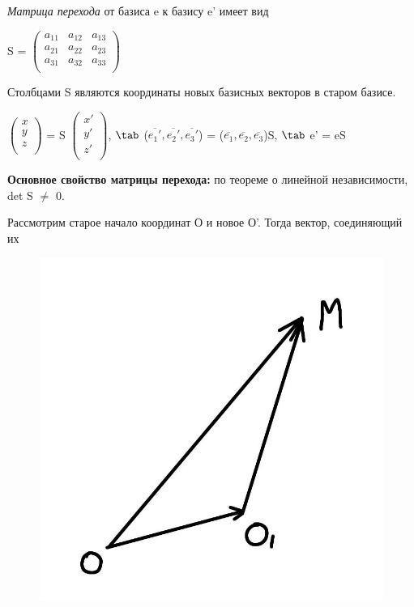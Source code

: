 \begin{definition}
	\textit{Матрица перехода} от базиса e к базису e' имеет вид\\
	\begin{center}
		S =
		$\begin{pmatrix}
			a_{11} & a_{12} & a_{13}\\
			a_{21} & a_{22} & a_{23}\\
			a_{31} & a_{32} & a_{33}\\
		\end{pmatrix}$
	\end{center} 
\end{definition}

Столбцами S являются координаты новых базисных векторов в старом базисе.\\

\begin{center}
	$\begin{pmatrix*}
		x\\
		y\\
		z\\
	\end{pmatrix*}$ = S
	$\begin{pmatrix*}
		x'\\
		y'\\
		z'\\
	\end{pmatrix*}$, $\tab$ ($\overline{e_1'}, \overline{e_2'}, \overline{e_3'}$) = ($\overline{e_1}, \overline{e_2}, \overline{e_3}$)S, $\tab$ e' = eS
\end{center}

\textbf{Основное свойство матрицы перехода:} по теореме о линейной независимости, det S $\neq$ 0.

Рассмотрим старое начало координат О и новое О'. Тогда вектор, соединяющий их\\

\begin{figure}
	\includegraphics[width=0.6\linewidth]{images/переход1.jpeg}
\end{figure}

